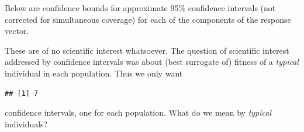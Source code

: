 \documentclass[
  ignorenonframetext,
]{beamer}
\newenvironment{Shaded}{\begin{snugshade}}{\end{snugshade}}
\newcommand{\FloatTok}[1]{\textcolor[rgb]{0.00,0.00,0.81}{#1}}
\newcommand{\FunctionTok}[1]{\textcolor[rgb]{0.00,0.00,0.00}{#1}}
\newcommand{\NormalTok}[1]{#1}
\newcommand{\OtherTok}[1]{\textcolor[rgb]{0.56,0.35,0.01}{#1}}
\newcommand{\SpecialCharTok}[1]{\textcolor[rgb]{0.00,0.00,0.00}{#1}}
\begin{document}
\begin{frame}[fragile]{}
\protect\hypertarget{section-29}{}
Below are confidence bounds for approximate 95\% confidence intervals
(not corrected for simultaneous coverage) for each of the components of
the response vector.

\vspace{12pt}
\tiny

\begin{Shaded}
\end{Shaded}

\vspace{12pt}
\normalsize

These are of no scientific interest whatsoever. The question of
scientific interest addressed by confidence intervals was about (best
surrogate of) fitness of a \emph{typical} individual in each population.
Thus we only want

\vspace{12pt}
\tiny

\begin{Shaded}
\end{Shaded}

\begin{verbatim}
## [1] 7
\end{verbatim}

\vspace{12pt}
\normalsize

confidence intervals, one for each population. What do we mean by
\emph{typical} individuals?
\end{frame}
\end{document}
